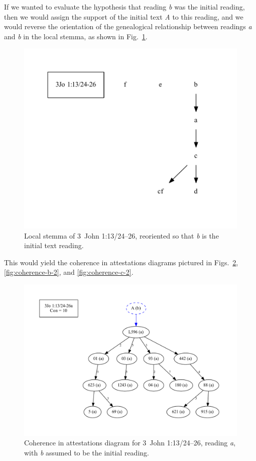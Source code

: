 \documentclass[a4paper, 12pt]{article}
\begin{document}
	\newpage
	
	If we wanted to evaluate the hypothesis that reading \emph{b} was the initial reading, then we would assign the support of the initial text \emph{A} to this reading, and we would reverse the orientation of the genealogical relationship between readings \emph{a} and \emph{b} in the local stemma, as shown in Fig.~\ref{fig:local-stemma-b-initial}.
	
	\begin{figure}[h!]
		\centering
		\includegraphics[scale=0.6666]{../graphics/B25K1V13U24-26-local-stemma-b-initial.pdf}
		\caption{Local stemma of 3~John 1:13/24–26, reoriented so that \emph{b} is the initial text reading.}
		\label{fig:local-stemma-b-initial}
	\end{figure}
	\noindent
	This would yield the coherence in attestations diagrams pictured in Figs.~\ref{fig:coherence-a-2}, \ref{fig:coherence-b-2}, and \ref{fig:coherence-c-2}.
	
	\begin{figure}
		\centering
		\includegraphics[scale=0.3333]{../graphics/B25K1V13U24-26Ra-coherence-attestations-2.pdf}
		\caption{Coherence in attestations diagram for 3~John 1:13/24–26, reading \emph{a}, with \emph{b} assumed to be the initial reading.}
		\label{fig:coherence-a-2}
	\end{figure}
	
\end{document}
